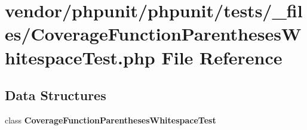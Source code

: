 \section{vendor/phpunit/phpunit/tests/\+\_\+files/\+Coverage\+Function\+Parentheses\+Whitespace\+Test.php File Reference}
\label{phpunit_2tests_2__files_2_coverage_function_parentheses_whitespace_test_8php}
\subsection*{Data Structures}
\begin{DoxyCompactItemize}
\item 
class {\bf Coverage\+Function\+Parentheses\+Whitespace\+Test}
\end{DoxyCompactItemize}
